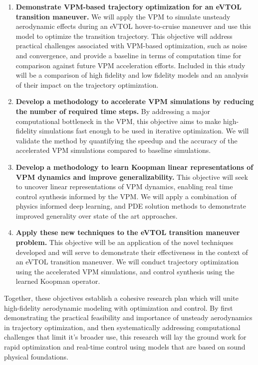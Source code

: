 \documentclass[12pt, letterpaper]{article}
\begin{document}
\begin{enumerate}
    \item \textbf{Demonstrate VPM-based trajectory optimization for an eVTOL transition maneuver.} 
    We will apply the VPM to simulate unsteady aerodynamic effects during an eVTOL hover-to-cruise maneuver and use this model to optimize the transition trajectory. This objective will address practical challenges associated with VPM-based optimization, such as noise and convergence, and provide a baseline in terms of computation time for comparison against future VPM acceleration efforts.  Included in this study will be a comparison of high fidelity and low fidelity models and an analysis of their impact on the trajectory optimization.

    \item \textbf{Develop a methodology to accelerate VPM simulations by reducing the number of required time steps.} 
    By addressing a major computational bottleneck in the VPM, this objective aims to make high-fidelity simulations fast enough to be used in iterative optimization. We will validate the method by quantifying the speedup and the accuracy of the accelerated VPM simulations compared to baseline simulations. 

    \item \textbf{Develop a methodology to learn Koopman linear representations of VPM dynamics and improve generalizability.} 
    This objective will seek to uncover linear representations of VPM dynamics, enabling real time control synthesis informed by the VPM.  We will apply a combination of physics informed deep learning, and PDE solution methods to demonstrate improved generality over state of the art approaches.  

    \item \textbf{Apply these new techniques to the eVTOL transition maneuver problem.}
    This objective will be an application of the novel techniques developed and will serve to demonstrate their effectiveness in the context of an eVTOL transition maneuver.  We will conduct trajectory optimization using the accelerated VPM simulations, and control synthesis using the learned Koopman operator.
\end{enumerate}

Together, these objectives establish a cohesive research plan which will unite high-fidelity aerodynamic modeling with optimization and control.  By first demonstrating the practical feasibility and importance of unsteady aerodynamics in trajectory optimization, and then systematically addressing computational challenges that limit it's broader use, this research will lay the ground work for rapid optimization and real-time control using models that are based on sound physical foundations. 
\end{document}
